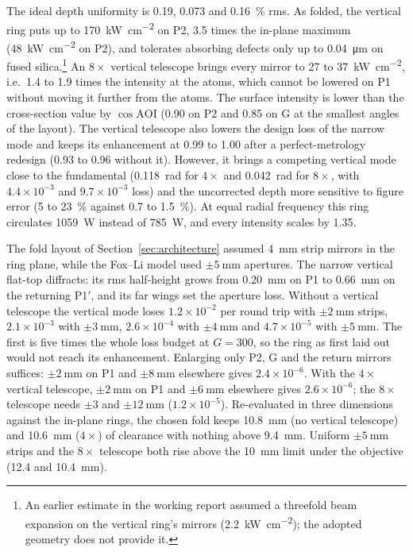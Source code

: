 \documentclass[11pt]{article}
\begin{document}
The ideal depth uniformity is 0.19, 0.073 and \SI{0.16}{\percent} rms. As folded, the vertical ring puts
up to \SI{170}{\kilo\watt\per\centi\metre\squared} on P2, 3.5 times the in-plane maximum (\SI{48}{\kilo\watt\per\centi\metre\squared} on P2), and tolerates
absorbing defects only up to \SI{0.04}{\micro\metre} on fused silica.\footnote{An earlier estimate in
the working report assumed a threefold beam expansion on the vertical ring's mirrors
(\SI{2.2}{\kilo\watt\per\centi\metre\squared}); the adopted geometry does not provide it.} An $8\times$
vertical telescope brings every mirror to 27 to \SI{37}{\kilo\watt\per\centi\metre\squared}, i.e.\ 1.4
to 1.9 times the intensity at the atoms, which cannot be lowered on P1 without moving it further from
the atoms. The surface intensity is lower than the cross-section value by $\cos\mathrm{AOI}$ (0.90 on P2
and 0.85 on G at the smallest angles of the layout). The vertical telescope also lowers the design loss
of the narrow mode and keeps its enhancement at 0.99 to 1.00 after a perfect-metrology redesign (0.93 to
0.96 without it). However, it brings a competing vertical mode close to the fundamental (\SI{0.118}{\radian} for
$4\times$ and \SI{0.042}{\radian} for $8\times$, with $4.4\times10^{-3}$ and $9.7\times10^{-3}$ loss) and the uncorrected depth more sensitive to figure error (5 to \SI{23}{\percent} against 0.7
to \SI{1.5}{\percent}). At equal radial frequency this ring circulates \SI{1059}{\watt} instead of
\SI{785}{\watt}, and every intensity scales by 1.35.

The fold layout of Section~\ref{sec:architecture} assumed \SI{4}{\milli\metre} strip mirrors in the ring
plane, while the Fox--Li model used $\pm\SI{5}{\milli\metre}$ apertures. The narrow vertical flat-top
diffracts: its rms half-height grows from \SI{0.20}{\milli\metre} on P1 to \SI{0.66}{\milli\metre} on the
returning P1$'$, and its far wings set the aperture loss. Without a vertical telescope the vertical mode
loses $1.2\times10^{-2}$ per round trip with $\pm\SI{2}{\milli\metre}$ strips, $2.1\times10^{-3}$ with
$\pm\SI{3}{\milli\metre}$, $2.6\times10^{-4}$ with $\pm\SI{4}{\milli\metre}$ and $4.7\times10^{-5}$ with
$\pm\SI{5}{\milli\metre}$. The first is five times the whole loss budget at $G = 300$, so the ring as first
laid out would not reach its enhancement. Enlarging only P2, G and the return mirrors suffices:
$\pm\SI{2}{\milli\metre}$ on P1 and $\pm\SI{8}{\milli\metre}$ elsewhere gives $2.4\times10^{-6}$. With the
$4\times$ vertical telescope, $\pm\SI{2}{\milli\metre}$ on P1 and $\pm\SI{6}{\milli\metre}$ elsewhere gives
$2.6\times10^{-6}$; the $8\times$ telescope needs $\pm3$ and $\pm\SI{12}{\milli\metre}$ ($1.2\times10^{-5}$).
Re-evaluated in three dimensions against the in-plane rings, the chosen fold keeps \SI{10.8}{\milli\metre}
(no vertical telescope) and \SI{10.6}{\milli\metre} ($4\times$) of clearance with nothing above
\SI{9.4}{\milli\metre}. Uniform $\pm\SI{5}{\milli\metre}$ strips and the $8\times$ telescope both rise above the
\SI{10}{\milli\metre} limit under the objective (12.4 and \SI{10.4}{\milli\metre}).
\end{document}
